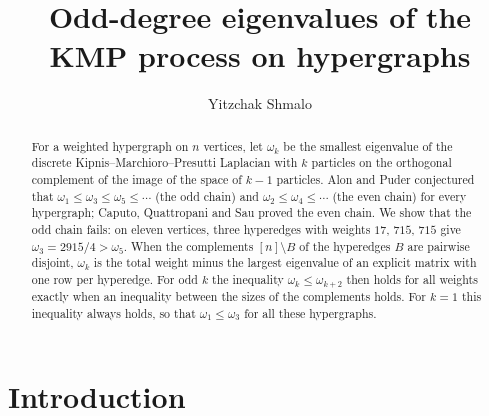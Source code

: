 \documentclass[11pt]{amsart}
\title[Odd-degree eigenvalues of KMP on hypergraphs]{Odd-degree eigenvalues of the KMP process on hypergraphs}
\author[Yitzchak Shmalo]{Yitzchak Shmalo}
\theoremstyle{remark}
\numberwithin{equation}{section}
\begin{document}
\begin{abstract}
For a weighted hypergraph on $n$ vertices, let $\omega_k$ be the smallest eigenvalue of the discrete Kipnis--Marchioro--Presutti Laplacian with $k$ particles on the orthogonal complement of the image of the space of $k-1$ particles. Alon and Puder conjectured that $\omega_1\le\omega_3\le\omega_5\le\cdots$ (the odd chain) and $\omega_2\le\omega_4\le\cdots$ (the even chain) for every hypergraph; Caputo, Quattropani and Sau proved the even chain. We show that the odd chain fails: on eleven vertices, three hyperedges with weights $17$, $715$, $715$ give $\omega_3=2915/4>\omega_5$. When the complements $[n]\setminus B$ of the hyperedges $B$ are pairwise disjoint, $\omega_k$ is the total weight minus the largest eigenvalue of an explicit matrix with one row per hyperedge. For odd $k$ the inequality $\omega_k\le\omega_{k+2}$ then holds for all weights exactly when an inequality between the sizes of the complements holds. For $k=1$ this inequality always holds, so that $\omega_1\le\omega_3$ for all these hypergraphs.
\end{abstract}

\maketitle

\section{Introduction}
\end{document}
